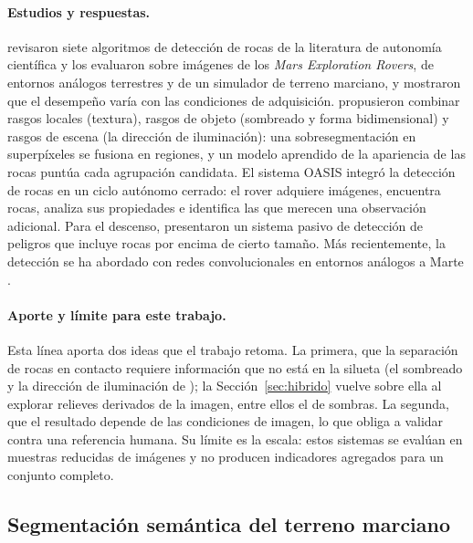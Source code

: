 \paragraph{Estudios y respuestas.} \citet{thompson2007rockdet} revisaron siete algoritmos de
detección de rocas de la literatura de autonomía científica y los evaluaron sobre imágenes de
los \textit{Mars Exploration Rovers}, de entornos análogos terrestres y de un simulador de
terreno marciano, y mostraron que el desempeño varía con las condiciones de adquisición.
\citet{dunlop2007multiscale} propusieron combinar rasgos locales (textura), rasgos de objeto
(sombreado y forma bidimensional) y rasgos de escena (la dirección de iluminación): una
sobresegmentación en superpíxeles se fusiona en regiones, y un modelo aprendido de la
apariencia de las rocas puntúa cada agrupación candidata. El sistema OASIS
\citep{castano2007oasis} integró la detección de rocas en un ciclo autónomo cerrado: el rover
adquiere imágenes, encuentra rocas, analiza sus propiedades e identifica las que merecen una
observación adicional. Para el descenso, \citet{huertas2006hazard} presentaron un sistema
pasivo de detección de peligros que incluye rocas por encima de cierto tamaño. Más
recientemente, la detección se ha abordado con redes convolucionales en entornos análogos a
Marte \citep{furlan2019rockcnn}.

\paragraph{Aporte y límite para este trabajo.} Esta línea aporta dos ideas que el trabajo
retoma. La primera, que la separación de rocas en contacto requiere información que no está
en la silueta (el sombreado y la dirección de iluminación de \citet{dunlop2007multiscale});
la Sección~\ref{sec:hibrido} vuelve sobre ella al explorar relieves derivados de la imagen,
entre ellos el de sombras. La
segunda, que el resultado depende de las condiciones de imagen, lo que obliga a validar contra
una referencia humana. Su límite es la escala: estos sistemas se evalúan en muestras reducidas
de imágenes y no producen indicadores agregados para un conjunto completo.

\subsection{Segmentación semántica del terreno marciano}
\label{sec:rev-segmentacion}

